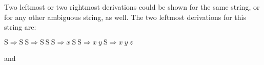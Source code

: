 \documentclass[11pt]{article}
\begin{document}
\begin{enumerate}
\begin{multicols}{2}
\begin{center}

                    \end{center}

                    \begin{center}


                    \end{center}

                  \end{multicols}

                  \vspace{-10mm}

                  Two leftmost or two rightmost derivations could be shown
                  for the same string, or for any other ambiguous string,
                  as well.  The two leftmost derivations for this string
                  are:

                  \smallskip

                  \(
                    \mathrm{S} \Longrightarrow \mathrm{S \ S}
                    \Longrightarrow \mathrm{S \ S \ S} \Longrightarrow x \
                    \mathrm{S \ S} \Longrightarrow x \ y \ \mathrm{S}
                    \Longrightarrow x \ y \ z
                  \)

                  \smallskip

                  and


\end{enumerate}
\end{document}
